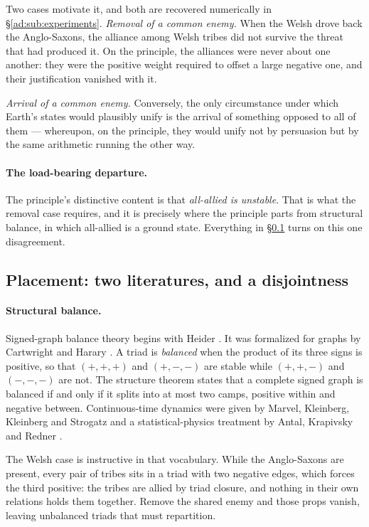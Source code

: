 \documentclass[11pt]{article}
\numberwithin{equation}{section}
\theoremstyle{plain}
\theoremstyle{definition}
\theoremstyle{remark}
\begin{document}
Two cases motivate it, and both are recovered numerically in
\S\ref{ad:sub:experiments}. \emph{Removal of a common enemy.} When the Welsh drove back the
Anglo-Saxons, the alliance among Welsh tribes did not survive the
threat that had produced it. On the principle, the alliances were never
about one another: they were the positive weight required to offset a
large negative one, and their justification vanished with it.

\emph{Arrival of a common enemy.} Conversely, the only circumstance
under which Earth's states would plausibly unify is the arrival of
something opposed to all of them --- whereupon, on the principle, they
would unify not by persuasion but by the same arithmetic running the
other way.

\paragraph{The load-bearing departure.}\label{ad:rem:departure}
The principle's distinctive content is that \emph{all-allied is
unstable}. That is what the removal case requires, and it is precisely
where the principle parts from structural balance, in which all-allied
is a ground state. Everything in \S\ref{ad:sub:placement} turns on this
one disagreement.

\subsection{Placement: two literatures, and a disjointness}
\label{ad:sub:placement}

\paragraph{Structural balance.}

Signed-graph balance theory begins with Heider \cite{Hei46}. It was
formalized for graphs by Cartwright and Harary \cite{CH56}. A triad is
\emph{balanced} when the product of its three signs is positive, so that
$(+,+,+)$ and $(+,-,-)$ are stable while $(+,+,-)$ and $(-,-,-)$ are
not. The structure theorem states that a complete signed graph is
balanced if and only if it splits into at most two camps, positive
within and negative between. Continuous-time dynamics were given by
Marvel, Kleinberg, Kleinberg and Strogatz \cite{MKKS11} and a
statistical-physics treatment by Antal, Krapivsky and Redner
\cite{AKR05}.

The Welsh case is instructive in that vocabulary. While the
Anglo-Saxons are present, every pair of tribes sits in a triad with two
negative edges, which forces the third positive: the tribes are allied
by triad closure, and nothing in their own relations holds them
together. Remove the shared enemy and those props vanish, leaving
unbalanced triads that must repartition.
\end{document}
